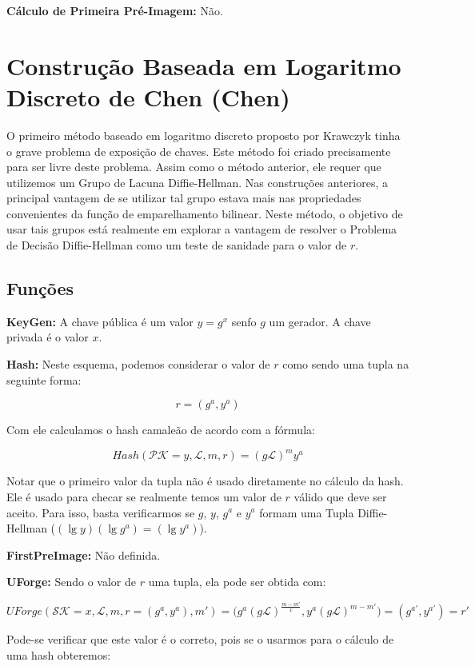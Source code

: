 \documentclass[a4paper]{article}
\begin{document}
\textbf{Cálculo de Primeira Pré-Imagem: }Não.

\section{Construção Baseada em Logaritmo Discreto de Chen (Chen)
  \cite{chen}}

O primeiro método baseado em logaritmo discreto proposto por Krawczyk
tinha o grave problema de exposição de chaves. Este método foi criado
precisamente para ser livre deste problema. Assim como o método
anterior, ele requer que utilizemos um Grupo de Lacuna
Diffie-Hellman. Nas construções anteriores, a principal vantagem de se
utilizar tal grupo estava mais nas propriedades convenientes da função
de emparelhamento bilinear. Neste método, o objetivo de usar tais
grupos está realmente em explorar a vantagem de resolver o Problema de
Decisão Diffie-Hellman como um teste de sanidade para o valor de $r$.

\subsection{Funções}

\textbf{KeyGen: }A chave pública é um valor $y=g^x$ senfo $g$ um
gerador. A chave privada é o valor $x$.

\textbf{Hash: }Neste esquema, podemos considerar o valor de $r$ como
sendo uma tupla na seguinte forma:

$$
r = (g^a, y^a)
$$

Com ele calculamos o hash camaleão de acordo com a fórmula:

$$
Hash(\mathcal{PK}=y, \mathcal{L}, m, r) = (g\mathcal{L})^my^a
$$

Notar que o primeiro valor da tupla não é usado diretamente no cálculo
da hash. Ele é usado para checar se realmente temos um valor de $r$
válido que deve ser aceito. Para isso, basta verificarmos se $g$, $y$,
$g^a$ e $y^a$ formam uma Tupla Diffie-Hellman ($(\lg y)(\lg g^a) =(\lg
y^a)$).

\textbf{FirstPreImage:} Não definida.

\textbf{UForge:} Sendo o valor de $r$ uma tupla, ela pode ser obtida
com:

$$UForge(\mathcal{SK}=x, \mathcal{L}, m, r=(g^a,y^a), m') =
\big(g^a(g\mathcal{L})^{\frac{m-m'}{x}}, y^a(g\mathcal{L})^{m-m'}\big) =
(g^{a'}, y^{a'}) = r'
$$

Pode-se verificar que este valor é o correto, pois se o usarmos para o
cálculo de uma hash obteremos:
\end{document}
